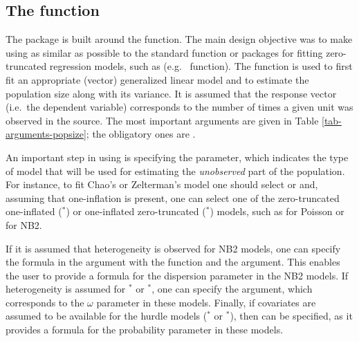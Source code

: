 \documentclass[
]{jss}
\newcommand{\1}{\mathcal{I}} \newcommand{\bZero}{\boldsymbol{0}}
\begin{document}
\subsection[The estimatePopsize function]{The  function}

The  package is built around the
 function. The main design objective was to make
using  as similar as possible to the standard
 function or packages for fitting zero-truncated
regression models, such as 
(e.g.~ function). The 
function is used to first fit an appropriate (vector) generalized linear
model and to estimate the population size along with its variance. It is
assumed that the response vector (i.e.~the dependent variable)
corresponds to the number of times a given unit was observed in the
source. The most important arguments are given in Table
\ref{tab-arguments-popsize}; the obligatory ones are
.

An important step in using  is specifying the
 parameter, which indicates the type of model that will be
used for estimating the \emph{unobserved} part of the population. For
instance, to fit Chao's or Zelterman's model one should select
 or  and, assuming that one-inflation is
present, one can select one of the zero-truncated one-inflated
(\(^\ast\)) or one-inflated zero-truncated
(\(^\ast\)) models, such as  for Poisson or
 for NB2.

If it is assumed that heterogeneity is observed for NB2 models, one can
specify the formula in the  argument with the
 function and the  argument. This
enables the user to provide a formula for the dispersion parameter in
the NB2 models. If heterogeneity is assumed for \(^\ast\) or
\(^\ast\), one can specify the  argument,
which corresponds to the \(\omega\) parameter in these models. Finally,
if covariates are assumed to be available for the hurdle models
(\(^\ast\) or \(^\ast\)), then
 can be specified, as it provides a formula for the
probability parameter in these models.
\end{document}
